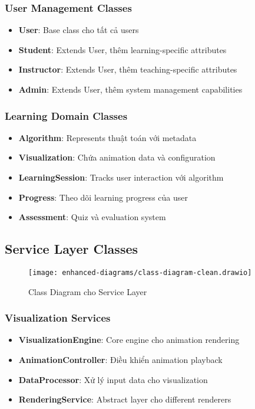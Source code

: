\subsubsection{User Management Classes}

\begin{itemize}
    \item \textbf{User}: Base class cho tất cả users
    \item \textbf{Student}: Extends User, thêm learning-specific attributes
    \item \textbf{Instructor}: Extends User, thêm teaching-specific attributes  
    \item \textbf{Admin}: Extends User, thêm system management capabilities
\end{itemize}

\subsubsection{Learning Domain Classes}

\begin{itemize}
    \item \textbf{Algorithm}: Represents thuật toán với metadata
    \item \textbf{Visualization}: Chứa animation data và configuration
    \item \textbf{LearningSession}: Tracks user interaction với algorithm
    \item \textbf{Progress}: Theo dõi learning progress của user
    \item \textbf{Assessment}: Quiz và evaluation system
\end{itemize}

\subsection{Service Layer Classes}
\label{subsec:service-classes}

\begin{figure}[H]
\centering
\texttt{[image: enhanced-diagrams/class-diagram-clean.drawio]}
\caption{Class Diagram cho Service Layer}
\label{fig:class-services}
\end{figure}

\subsubsection{Visualization Services}

\begin{itemize}
    \item \textbf{VisualizationEngine}: Core engine cho animation rendering
    \item \textbf{AnimationController}: Điều khiển animation playback
    \item \textbf{DataProcessor}: Xử lý input data cho visualization
    \item \textbf{RenderingService}: Abstract layer cho different renderers
\end{itemize}

